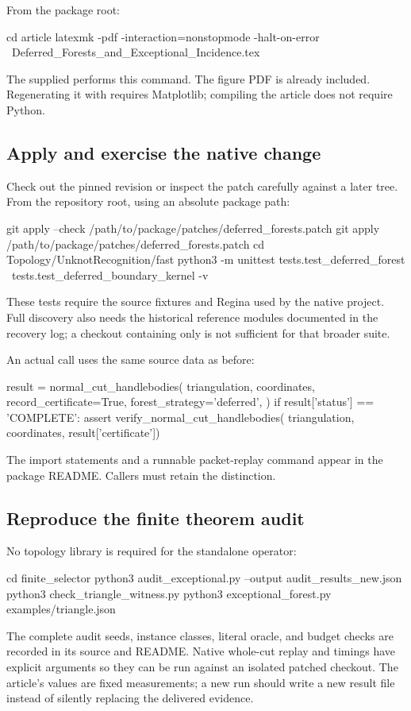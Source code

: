 From the package root:
\begin{Code}
cd article
latexmk -pdf -interaction=nonstopmode -halt-on-error \
  Deferred_Forests_and_Exceptional_Incidence.tex
\end{Code}
The supplied  performs this command.  The figure PDF is
already included.  Regenerating it with 
requires Matplotlib; compiling the article does not require Python.

\subsection{Apply and exercise the native change}

Check out the pinned revision or inspect the patch carefully against a
later tree.  From the repository root, using an absolute package path:
\begin{Code}
git apply --check /path/to/package/patches/deferred_forests.patch
git apply /path/to/package/patches/deferred_forests.patch
cd Topology/UnknotRecognition/fast
python3 -m unittest tests.test_deferred_forest \
  tests.test_deferred_boundary_kernel -v
\end{Code}
These tests require the source fixtures and Regina used by the native
project.  Full discovery also needs the historical reference modules
documented in the recovery log; a checkout containing only \code{fast}
is not sufficient for that broader suite.

An actual call uses the same source data as before:
\begin{Code}
result = normal_cut_handlebodies(
    triangulation, coordinates,
    record_certificate=True,
    forest_strategy='deferred',
)
if result['status'] == 'COMPLETE':
    assert verify_normal_cut_handlebodies(
        triangulation, coordinates, result['certificate'])
\end{Code}
The import statements and a runnable packet-replay command appear in the
package README.  Callers must retain the  distinction.

\subsection{Reproduce the finite theorem audit}

No topology library is required for the standalone operator:
\begin{Code}
cd finite_selector
python3 audit_exceptional.py --output audit_results_new.json
python3 check_triangle_witness.py
python3 exceptional_forest.py examples/triangle.json
\end{Code}
The complete audit seeds, instance classes, literal oracle, and budget
checks are recorded in its source and README.  Native whole-cut replay
and timings have explicit \code{--fast-root} arguments so they can be
run against an isolated patched checkout.  The article's values are
fixed measurements; a new run should write a new result file instead of
silently replacing the delivered evidence.

